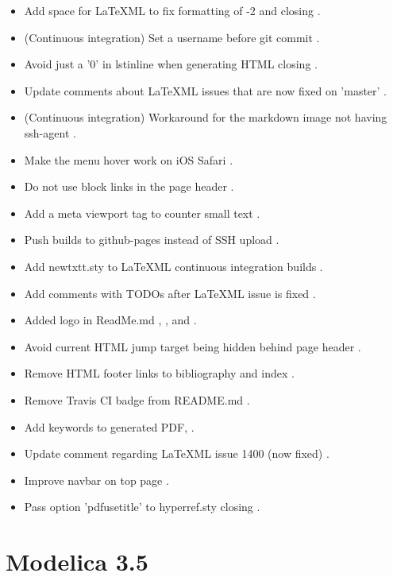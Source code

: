 \begin{itemize}
\begin{itemize}
\item Add space for LaTeXML to fix formatting of -2  and  closing .
\item (Continuous integration) Set a username before git commit .
\item Avoid just a '0' in lstinline when generating HTML  closing .
\item Update comments about LaTeXML issues that are now fixed on 'master' .
\item (Continuous integration) Workaround for the markdown image not having ssh-agent .
\item Make the menu hover work on iOS Safari .
\item Do not use block links in the page header .
\item Add a meta viewport tag to counter small text .
\item Push builds to github-pages instead of SSH upload .
\item Add newtxtt.sty to LaTeXML continuous integration builds .
\item Add comments with TODOs after LaTeXML issue is fixed .
\item Added logo in ReadMe.md , , and .
\item Avoid current HTML jump target being hidden behind page header .
\item Remove HTML footer links to bibliography and index .
\item Remove Travis CI badge from README.md .
\item Add keywords to generated PDF, .
\item Update comment regarding LaTeXML issue 1400 (now fixed) .
\item Improve navbar on top page .
\item Pass option 'pdfusetitle' to hyperref.sty  closing .
\end{itemize}
\end{itemize}

\section{Modelica 3.5}\label{modelica-3-5}


